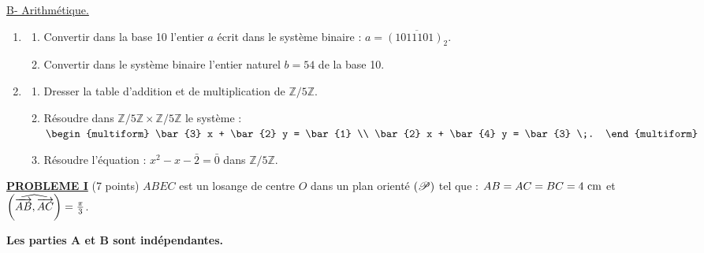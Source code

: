       \underline{B- Arithm\'etique.} 
      \begin{enumerate}
            \item \begin{enumerate}
                        \item Convertir dans la base 10 l'entier $a$ \'ecrit dans le syst\`eme binaire : 
                              $a = \overline{(1011101)_2}$.
                        \item Convertir dans le syst\`eme binaire l'entier naturel $b = 54$ de la base 10.
                  \end{enumerate}
            \item \begin{enumerate}
                        \item Dresser la table d'addition et de multiplication de $\mathbb{Z}/5\mathbb{Z}$.
                        \item R\'esoudre dans $\mathbb{Z}/5\mathbb{Z} \times \mathbb{Z}/5\mathbb{Z}$ le syst\`eme : 
                              $
                                    \begin{multiform}
                                          \bar{3} x + \bar{2} y = \bar{1} \\
                                          \bar{2} x + \bar{4} y = \bar{3} \;.
                                    \end{multiform}
                              $ 
                        \item R\'esoudre l'\'equation : $x^2 - x - \bar{2} = \bar{0}$ dans $\mathbb{Z}/5\mathbb{Z}$.
                  \end{enumerate}
      \end{enumerate}
\noindent \underline{\textsc{\textbf{PROBLEME I}}} (7 points) \newline
            $ABEC$ est un losange de centre $O$ dans un plan orient\'e $(\mathscr{P})$ tel que : 
            $AB = AC = BC = 4~\mathrm{cm}$ et $\left( \widehat{ \overrightarrow{AB} , \overrightarrow{AC} } \right) = \frac{\pi}{3}$.
            
            \textbf{Les parties A et B sont ind\'ependantes.}
            
